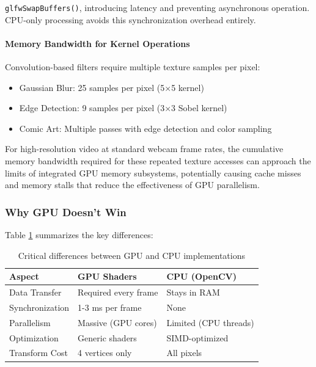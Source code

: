 \documentclass[12pt,a4paper]{article}
\begin{document}
\texttt{glfwSwapBuffers()}, introducing latency and preventing asynchronous operation. CPU-only processing avoids this synchronization overhead entirely.

\paragraph{Memory Bandwidth for Kernel Operations}
Convolution-based filters require multiple texture samples per pixel:
\begin{itemize}
    \item Gaussian Blur: 25 samples per pixel (5×5 kernel)
    \item Edge Detection: 9 samples per pixel (3×3 Sobel kernel)
    \item Comic Art: Multiple passes with edge detection and color sampling
\end{itemize}

For high-resolution video at standard webcam frame rates, the cumulative memory bandwidth required for these repeated texture accesses can approach the limits of integrated GPU memory subsystems, potentially causing cache misses and memory stalls that reduce the effectiveness of GPU parallelism.

\subsubsection{Why GPU Doesn't Win}

Table \ref{tab:shader_cpu_comparison} summarizes the key differences:

\begin{table}[H]
\centering
\caption{Critical differences between GPU and CPU implementations}
\label{tab:shader_cpu_comparison}
\begin{tabular}{lll}
\toprule
\textbf{Aspect} & \textbf{GPU Shaders} & \textbf{CPU (OpenCV)} \\
\midrule
Data Transfer & Required every frame & Stays in RAM \\
Synchronization & 1-3 ms per frame & None \\
Parallelism & Massive (GPU cores) & Limited (CPU threads) \\
Optimization & Generic shaders & SIMD-optimized \\
Transform Cost & 4 vertices only & All pixels \\
\bottomrule
\end{tabular}
\end{table}
\end{document}
